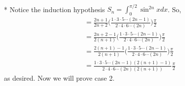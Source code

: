 \documentclass[10pt]{article}
\makeatletter
\newenvironment{question}[2][Question]{\begin{trivlist}
\item[\hskip \labelsep {\bfseries #1}\hskip \labelsep {\bfseries #2.}]}{\end{trivlist}}
\renewenvironment{proof}[1][\proofname]{\par
\pushQED{\qed}
\normalfont \topsep6\p@\@plus6\p@\relax
\trivlist
\item[\hskip\labelsep\itshape#1\@addpunct{.}]\mbox{}\\*}{\popQED\endtrivlist\@endpefalse}
\makeatother
\begin{document}
\begin{question}{2}
\begin{proof}
		\noindent
		Notice the induction hypothesis $S_n= \int^{\pi / 2}_0 \sin^{2n} xdx$. So,
		\begin{align*}
			 & =  \frac{2n+1}{2n+2} \Big(\frac{1 \cdot 3 \cdot 5 \cdots (2n-1)}{2 \cdot 4 \cdot 6 \cdots (2n)}\Big) \frac{\pi}{2}         \\
			 & =  \frac{2n+2 - 1}{2(n+1)} \Big(\frac{1 \cdot 3 \cdot 5 \cdots (2n-1)}{2 \cdot 4 \cdot 6 \cdots (2n)}\Big) \frac{\pi}{2}   \\
			 & =  \frac{2(n+1) - 1}{2(n+1)} \Big(\frac{1 \cdot 3 \cdot 5 \cdots (2n-1)}{2 \cdot 4 \cdot 6 \cdots (2n)}\Big) \frac{\pi}{2} \\
			 & =  \frac{1 \cdot 3 \cdot 5 \cdots (2n-1)(2(n+1) - 1)}{2 \cdot 4 \cdot 6 \cdots (2n)(2(n+1))} \frac{\pi}{2}
		\end{align*}
		as desired. Now we will prove case 2.


\end{proof}
\end{question}
\end{document}
